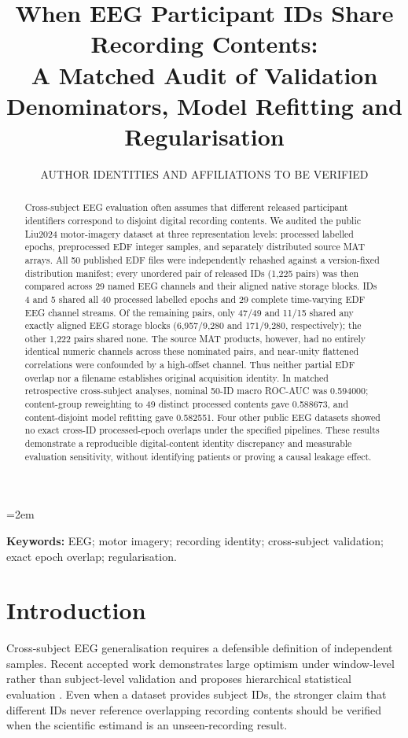 \documentclass[11pt,a4paper]{article}
\title{When EEG Participant IDs Share Recording Contents:\\
A Matched Audit of Validation Denominators, Model Refitting and Regularisation}
\author{AUTHOR IDENTITIES AND AFFILIATIONS TO BE VERIFIED}
\date{}
\begin{document}
\emergencystretch=2em\maketitle
\begin{abstract}
Cross-subject EEG evaluation often assumes that different released
participant identifiers correspond to disjoint digital recording
contents. We audited the public Liu2024 motor-imagery dataset at
three representation levels: processed labelled epochs, preprocessed
EDF integer samples, and separately distributed source MAT arrays.
All 50 published EDF files were independently rehashed against a
version-fixed distribution manifest; every unordered pair of
released IDs (1,225 pairs) was then compared across 29 named EEG
channels and their aligned native storage blocks. IDs 4 and 5
shared all 40 processed labelled epochs and 29 complete
time-varying EDF EEG channel streams. Of the remaining pairs,
only 47/49 and 11/15 shared any exactly aligned EEG storage
blocks (6,957/9,280 and 171/9,280, respectively); the other
1,222 pairs shared none. The source MAT products, however, had
no entirely identical numeric channels across these nominated
pairs, and near-unity flattened correlations were confounded by
a high-offset channel. Thus neither partial EDF overlap nor a
filename establishes original acquisition identity. In matched
retrospective cross-subject analyses, nominal 50-ID macro ROC-AUC
was 0.594000; content-group reweighting to 49 distinct processed
contents gave 0.588673, and content-disjoint model refitting
gave 0.582551. Four other public EEG datasets showed no exact
cross-ID processed-epoch overlaps under the specified pipelines.
These results demonstrate a reproducible digital-content identity
discrepancy and measurable evaluation sensitivity, without
identifying patients or proving a causal leakage effect.
\end{abstract}

\noindent\textbf{Keywords:} EEG; motor imagery; recording identity;
cross-subject validation; exact epoch overlap; regularisation.

\section{Introduction}
Cross-subject EEG generalisation requires a defensible definition of
independent samples. Recent accepted work demonstrates large optimism
under window-level rather than subject-level validation and proposes
hierarchical statistical evaluation \cite{gil2026subjectvalidation}.
Even when a dataset provides subject IDs, the stronger claim that
different IDs never reference overlapping recording contents should be
verified when the scientific estimand is an unseen-recording result.
\end{document}
